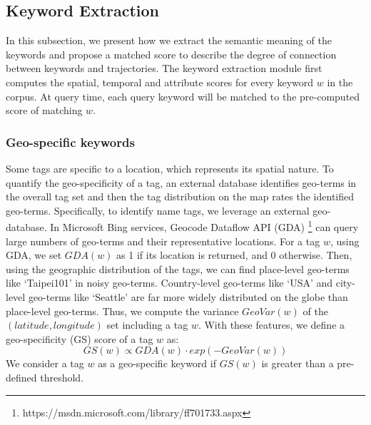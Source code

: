 ﻿\subsection{Keyword Extraction} \label{subsec:KE}
In this subsection, we present how we extract the semantic meaning of the keywords and propose a matched score to describe the degree of connection between keywords and trajectories. The keyword extraction module first computes the spatial, temporal and attribute scores for every keyword $w$ in the corpus. At query time, each query keyword will be matched to the pre-computed score of matching $w$.

\subsubsection{Geo-specific keywords} 
Some tags are specific to a location, which represents its spatial nature.
To quantify the geo-specificity of a tag, an external database identifies geo-terms in the overall tag set and then the tag distribution on the map rates the identified geo-terms. Specifically, to identify name tags, we leverage an external geo-database. In Microsoft Bing services, Geocode Dataflow API (GDA) \footnote{https://msdn.microsoft.com/library/ff701733.aspx} can query large numbers of geo-terms and their representative locations. For a tag $w$, using GDA, we set $GDA(w)$ as 1 if its location is returned, and 0 otherwise. Then, using the geographic distribution of the tags, we can find place-level geo-terms like `Taipei101' in noisy geo-terms. Country-level geo-terms like `USA' and city-level geo-terms like `Seattle' are far more widely distributed on the globe than place-level geo-terms. Thus, we compute the variance $GeoVar(w)$ of the $(latitude,longitude)$ set including a tag $w$. With these features, we define a geo-specificity (\textsf{GS}) score of a tag $w$ as:
\begin{equation}
GS(w) \propto GDA(w)\cdot exp(-GeoVar(w))
\end{equation}
We consider a tag $w$ as a geo-specific keyword if $GS(w)$ is greater than a pre-defined threshold.


